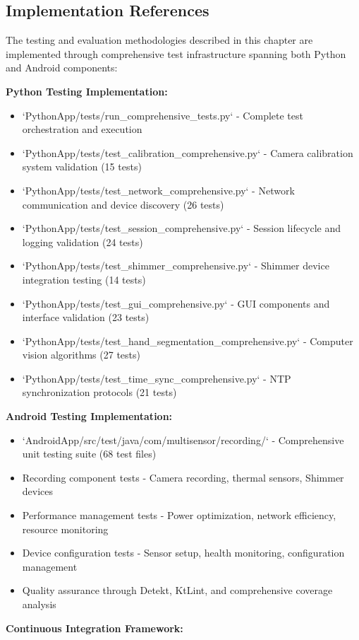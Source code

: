 \documentclass[12pt,a4paper]{article}
\begin{document}
\subsection{Implementation References}

The testing and evaluation methodologies described in this chapter are implemented through comprehensive test
infrastructure spanning both Python and Android components:

\textbf{Python Testing Implementation:}

\begin{itemize}
\item `PythonApp/tests/run_comprehensive_tests.py` - Complete test orchestration and execution
\item `PythonApp/tests/test_calibration_comprehensive.py` - Camera calibration system validation (15 tests)
\item `PythonApp/tests/test_network_comprehensive.py` - Network communication and device discovery (26 tests)
\item `PythonApp/tests/test_session_comprehensive.py` - Session lifecycle and logging validation (24 tests)
\item `PythonApp/tests/test_shimmer_comprehensive.py` - Shimmer device integration testing (14 tests)
\item `PythonApp/tests/test_gui_comprehensive.py` - GUI components and interface validation (23 tests)
\item `PythonApp/tests/test_hand_segmentation_comprehensive.py` - Computer vision algorithms (27 tests)
\item `PythonApp/tests/test_time_sync_comprehensive.py` - NTP synchronization protocols (21 tests)

\end{itemize}
\textbf{Android Testing Implementation:}

\begin{itemize}
\item `AndroidApp/src/test/java/com/multisensor/recording/` - Comprehensive unit testing suite (68 test files)
\item Recording component tests - Camera recording, thermal sensors, Shimmer devices
\item Performance management tests - Power optimization, network efficiency, resource monitoring
\item Device configuration tests - Sensor setup, health monitoring, configuration management
\item Quality assurance through Detekt, KtLint, and comprehensive coverage analysis

\end{itemize}
\textbf{Continuous Integration Framework:}
\end{document}
